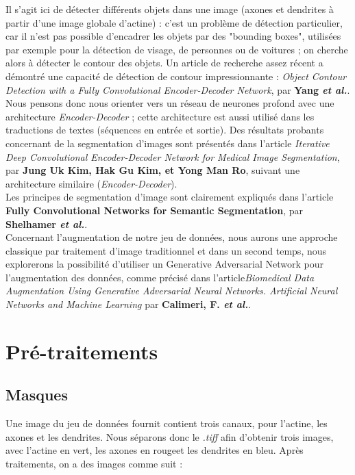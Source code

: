 \documentclass{report}
\begin{document}
Il s'agit ici de détecter différents objets dans une image (axones et dendrites
à partir d'une image globale d'actine) : c'est un problème de détection particulier,
car il n'est pas possible d'encadrer les objets par des "bounding boxes", utilisées
par exemple pour la détection de visage, de personnes ou de voitures ; on cherche
alors à détecter le contour des objets. Un article de recherche assez récent a
démontré une capacité de détection de contour impressionnante : \textit{Object Contour
 Detection with a Fully Convolutional Encoder-Decoder Network}, par \textbf{Yang
 \textit{et al.}}. Nous pensons donc nous orienter vers un réseau de neurones profond
avec une architecture \textit{Encoder-Decoder} ; cette architecture est aussi
utilisé dans les traductions de textes (séquences en entrée et sortie). Des résultats
probants concernant de la segmentation d'images sont présentés dans l'article
\textit{Iterative Deep Convolutional Encoder-Decoder Network for Medical Image
 Segmentation}, par \textbf{Jung Uk Kim, Hak Gu Kim, et Yong Man Ro}, suivant une
architecture similaire (\textit{Encoder-Decoder}). \\
Les principes de segmentation d'image sont clairement expliqués dans l'article
\textbf{Fully Convolutional Networks for Semantic Segmentation}, par \textbf{Shelhamer
 \textit{et al.}}. \\
Concernant l’augmentation de notre jeu de données, nous aurons une approche
classique par traitement d’image traditionnel et dans un second temps, nous
explorerons la possibilité d'utiliser un Generative Adversarial Network pour l’augmentation
des données, comme précisé dans l'article\textit{Biomedical Data Augmentation Using
Generative Adversarial Neural Networks. Artificial Neural Networks and Machine
Learning} par \textbf{Calimeri, F.
 \textit{et al.}}.


\chapter{Pré-traitements}

\section{Masques}

Une image du jeu de données fournit contient trois canaux, pour l'actine, les axones
et les dendrites. Nous séparons donc le \textit{.tiff} afin d'obtenir trois images,
avec l'actine en vert, les axones en rougeet les dendrites en bleu. Après traitements,
on a des images comme suit :
\end{document}
